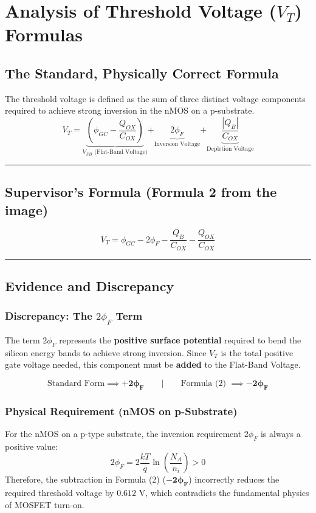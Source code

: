 \documentclass{article}
\begin{document}
\section*{Analysis of Threshold Voltage ($V_T$) Formulas}

\subsection*{The Standard, Physically Correct Formula}
The threshold voltage is defined as the sum of three distinct voltage components required to achieve strong inversion in the nMOS on a p-substrate.
$$
V_T = \underbrace{\left(\phi_{GC} - \frac{Q_{OX}}{C_{OX}}\right)}_{V_{FB} \text{ (Flat-Band Voltage)}} \mathbf{+} \underbrace{2\phi_F}_{\text{Inversion Voltage}} \mathbf{+} \underbrace{\frac{|Q_B|}{C_{OX}}}_{\text{Depletion Voltage}}
$$

\hrule

\subsection*{Supervisor's Formula (Formula 2 from the image)}
$$
V_T = \phi_{GC} - 2\phi_F - \frac{Q_B}{C_{OX}} - \frac{Q_{OX}}{C_{OX}}
$$

\hrule

\subsection*{Evidence and Discrepancy}

\subsubsection*{Discrepancy: The $2\phi_F$ Term}
The term $2\phi_F$ represents the \textbf{positive surface potential} required to bend the silicon energy bands to achieve strong inversion. Since $V_T$ is the total positive gate voltage needed, this component must be \textbf{added} to the Flat-Band Voltage.

\begin{equation}
\label{eq:discrepancy}
    \text{Standard Form} \implies \mathbf{+2\phi_F} \qquad | \qquad \text{Formula (2) } \implies \mathbf{-2\phi_F}
\end{equation}

\subsubsection*{Physical Requirement (nMOS on p-Substrate)}
For the nMOS on a p-type substrate, the inversion requirement $2\phi_F$ is always a positive value:
$$
2\phi_F = 2 \frac{kT}{q} \ln\left(\frac{N_A}{n_i}\right) > 0
$$
Therefore, the subtraction in Formula (2) ($\mathbf{-2\phi_F}$) incorrectly reduces the required threshold voltage by $0.612\text{ V}$, which contradicts the fundamental physics of MOSFET turn-on.
\end{document}
